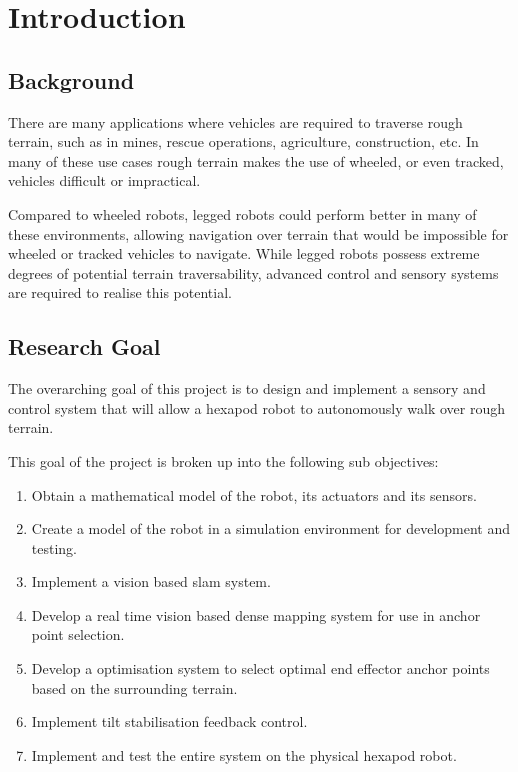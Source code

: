 \chapter{Introduction}

\section{Background}

There are many applications where vehicles are required to traverse rough terrain, such as in mines, rescue operations, agriculture, construction, etc. In many of these
use cases rough terrain makes the use of wheeled, or even tracked, vehicles difficult or impractical.

Compared to wheeled robots, legged robots could perform better in many of these environments, allowing navigation over terrain that would be impossible for wheeled or
tracked vehicles to navigate. While legged robots possess extreme degrees of potential terrain traversability, advanced control and sensory systems are required to 
realise this potential.


\section{Research Goal}
The overarching goal of this project is to design and implement a sensory and control system that will allow a hexapod robot to autonomously walk over rough terrain.

This goal of the project is broken up into the following sub objectives:

\begin{enumerate}
    \item Obtain a mathematical model of the robot, its actuators and its sensors.
    \item Create a model of the robot in a simulation environment for development and testing.
    \item Implement a vision based \ac{slam} system.
    \item Develop a real time vision based dense mapping system for use in anchor point selection.
    \item Develop a optimisation system to select optimal end effector anchor points based on the surrounding terrain.
    \item Implement tilt stabilisation feedback control.
    \item Implement and test the entire system on the physical hexapod robot.
\end{enumerate}


